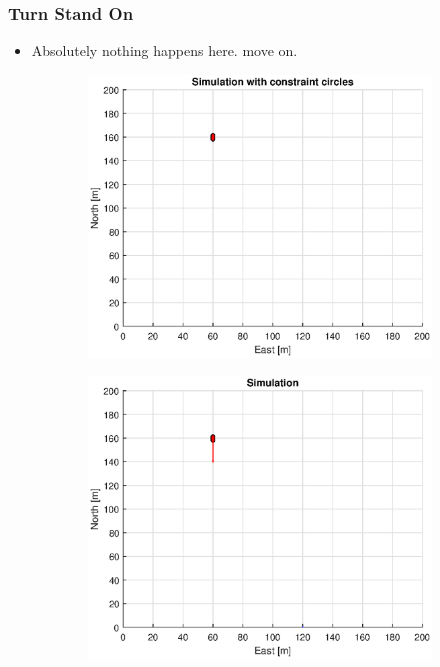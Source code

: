 \subsubsection{Turn Stand On}
\begin{itemize}
    \item Absolutely nothing happens here. move on.
\end{itemize}
\clearpage
\begin{figure}[!b] %
    \begin{subfigure}[b]{0.49\textwidth}
        \centering
        \includegraphics[width=\textwidth]{Images/Figures/sving_SO/Simple0_f1_Frame1}
    \end{subfigure}
    \hfill
    \begin{subfigure}[b]{0.499\textwidth}
        \centering
        \includegraphics[width=\textwidth]{Images/Figures/sving_SO/Simple0_f600_Frame1}

\end{subfigure}
\end{figure}
